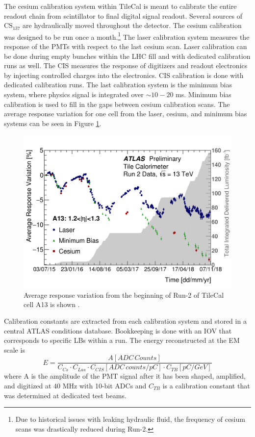 		The cesium calibration system within \gls{TileCal} is meant to calibrate the entire readout chain from scintillator to final digital signal readout. Several sources of $\mathrm{CS}_{137}$ are hydraulically moved throughout the detector. The cesium calibration was designed to be run once a month.\footnote{Due to historical issues with leaking hydraulic fluid, the frequency of cesium scans was drastically reduced during Run-2.} The laser calibration system measures the response of the \glspl{PMT} with respect to the last cesium scan. Laser calibration can be done during empty bunches within the \gls{LHC} fill and with dedicated calibration runs as well. The \gls{CIS} measures the response of digitizers and readout electronics by injecting controlled charges into the electronics. \gls{CIS} calibration is done with dedicated calibration runs. The last calibration system is the minimum bias system, where physics signal is integrated over $\sim 10 - 20 $ ms. Minimum bias calibration is used to fill in the gaps between cesium calibration scans. The average response variation for one cell from the laser, cesium, and minimum bias systems can be seen in Figure \ref{fig:tile-calib-a13}. 

		\begin{figure}
			\centering
			\includegraphics[width=.75\textwidth,keepaspectratio=true]{appendices/images/A13_run2.png}
			\caption{\label{fig:tile-calib-a13} Average response variation from the beginning of Run-2 of \gls{TileCal} cell A13 is shown \cite{Tile-Run2-perf}. }
		\end{figure}

		Calibration constants are extracted from each calibration system and stored in a central ATLAS conditions database. Bookkeeping is done with an \gls{IOV} that corresponds to specific \glspl{LB} within a run. The energy reconstructed at the \gls{EM} scale is 
		\begin{equation}
		E = \frac{A [ADC \, Counts]}{ C_{Cs} \cdot C_{Las} \cdot C_{CIS} [ADC \, counts/pC] \cdot C_{TB} [pC/GeV] }
		\end{equation}
		where A is the amplitude of the PMT signal after it has been shaped, amplified, and digitized at 40 MHz with 10-bit \glspl{ADC} and $C_{TB}$ is a calibration constant that was determined at dedicated test beams.


